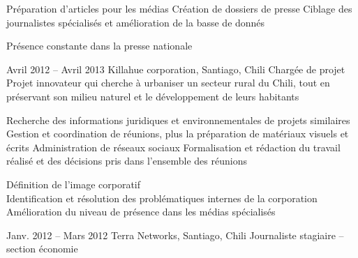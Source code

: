 \documentclass[30pt, french]{tccv}
\begin{document}
\begin{upshape}
\begin{experience}
\setlength{\parskip}{-10pt}
\begin{itemize}
      \setlength\itemsep{-3pt} 
      \cvitem[\checkmark]  Préparation d'articles pour les médias                                            
      \cvitem[\checkmark]  Création de dossiers de presse                                                     
      \cvitem[\checkmark]  Ciblage des journalistes spécialisés et amélioration de la basse de donnés  
\end{itemize}       
 Présence constante dans la presse nationale
\vspace{0.5cm}




\setlength{\parskip}{0pt}
\item{Avril 2012 -- Avril 2013 }     
  {Killahue corporation, Santiago, Chili}     
  {Chargée de projet}
\fontsize{9pt}{1em}\color{text}\bodyfontlight\upshape\selectfont
%
 Projet innovateur qui cherche à urbaniser un secteur rural du Chili, tout en préservant son milieu naturel et le développement de leurs habitants \\
     
\setlength{\parskip}{-10pt}
\begin{itemize}
      \setlength\itemsep{-3pt} 
      \cvitem[\checkmark] Recherche des informations juridiques et environnementales de projets similaires          
      \cvitem[\checkmark] Gestion et coordination de réunions, plus la préparation de matériaux visuels et écrits   
      \cvitem[\checkmark] Administration de réseaux sociaux                                                                    
      \cvitem[\checkmark] Formalisation et rédaction du travail réalisé et des décisions pris dans l’ensemble des réunions     
\end{itemize}      

  Définition de l’image corporatif \\
\mission{}            Identification et résolution des problématiques internes de la corporation \\
\mission{} 		Amélioration du niveau de présence dans les médias spécialisés \\


  
\setlength{\parskip}{0pt}
\item{Janv. 2012 -- Mars 2012 }     
  {Terra Networks, Santiago, Chili}     
  {Journaliste stagiaire – section économie}
  \fontsize{9pt}{1em}\color{text}\bodyfontlight\upshape\selectfont


\end{experience}
\end{upshape}
\end{document}
